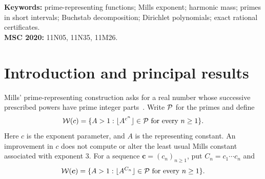 \maketitle
\begin{abstract}
For $c>1$, let $\W(c)$ be the set of real numbers $A>1$ for which
$\lfloor A^{c^n}\rfloor$ is prime for every $n\ge1$.
We prove a harmonic mass--compactness principle that converts a quantitative
almost-all prime lower bound into uncountably many representing constants.
An exceptional measure of size $X\exp[-D(\log\log X)^2]$, with sufficiently
large fixed $D$, controls all depths of the prime tree simultaneously.
The argument also treats bounded variable exponent sequences and proves
unboundedness, Lebesgue nullity, and nowhere density.
It recovers the zero-density ranges $c>6/5$ and $c>15/13$, and quantifies
the finite sieve inputs leading to $c>20/19$ and $c>43/41$ with their
respective source dependencies.
For the sharper extension, we identify an internal integer-moment
obstruction at the short-interval exponent $1/24$ and remove it by a
two-factor estimate valid at $1/25$, using the Chen--Gupta--Li large-value
theorem. Exact rational certificates verify the additional trilinear
regions and the finite boundary geometry.
Assuming four explicitly stated numerical Buchstab inequalities from
Li's third short-interval manuscript, we obtain
$\theta_*=1/24-10^{-23}$ and hence all
$c>24/(23+24\cdot10^{-23})$.
In particular, $c=24/23-10^{-23}$ is admissible.
The four numerical inequalities remain external hypotheses; the
exploratory recomputation of one integral is not an interval certificate.
The full prime-interval exponent $1/25$ is not claimed.
The single source embeds the exact verification programs and certificates.
\end{abstract}

\noindent\textbf{Keywords:} prime-representing functions; Mills exponent;
harmonic mass; primes in short intervals; Buchstab decomposition;
Dirichlet polynomials; exact rational certificates.\\
\noindent\textbf{MSC 2020:} 11N05, 11N35, 11M26.

\newpage
\tableofcontents
\newpage

\section{Introduction and principal results}\label{sec:introduction}

Mills' prime-representing construction asks for a real number whose
successive prescribed powers have prime integer parts~\cite{Mil47}.
Write $\mathcal P$ for the primes and define
\[
 \mathcal W(c)=\{A>1:\lfloor A^{c^n}\rfloor\in\mathcal P\text{ for every }n\ge1\}.
\]
Here $c$ is the exponent parameter, and $A$ is the representing constant.
An improvement in $c$ does not compute or alter the least usual Mills
constant associated with exponent $3$.
For a sequence $\boldsymbol c=(c_n)_{n\ge1}$, put
$C_n=c_1\cdots c_n$ and
\[
 \mathcal W(\boldsymbol c)=
 \{A>1:\lfloor A^{C_n}\rfloor\in\mathcal P\text{ for every }n\ge1\}.
\]

